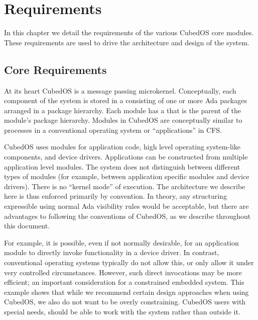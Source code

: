 
\chapter{Requirements}
\label{chapt:requirements}

In this chapter we detail the requirements of the various CubedOS core modules. These
requirements are used to drive the architecture and design of the system. 

\section{Core Requirements}
\label{sec:core-requirements}

At its heart CubedOS is a message passing microkernel. Conceptually, each component of the
system is stored in a  consisting of one or more Ada packages arranged in a
package hierarchy. Each module has a  that is the parent of the
module's package hierarchy. Modules in CubedOS are conceptually similar to processes in a
conventional operating system or ``applications'' in CFS.

CubedOS uses modules for application code, high level operating system-like components, and
device drivers. Applications can be constructed from multiple application level modules. The
system does not distinguish between different types of modules (for example, between application
specific modules and device drivers). There is no ``kernel mode'' of execution. The architecture
we describe here is thus enforced primarily by convention. In theory, any structuring
expressible using normal Ada visibility rules would be acceptable, but there are advantages to
following the conventions of CubedOS, as we describe throughout this document. 

For example, it is possible, even if not normally desirable, for an application module to
directly invoke functionality in a device driver. In contrast, conventional operating systems
typically do not allow this, or only allow it under very controlled circumstances. However, such
direct invocations may be more efficient; an important consideration for a constrained embedded
system. This example shows that while we recommend certain design approaches when using CubedOS,
we also do not want to be overly constraining. CubedOS users with special needs, should be able
to work with the system rather than outside it.

